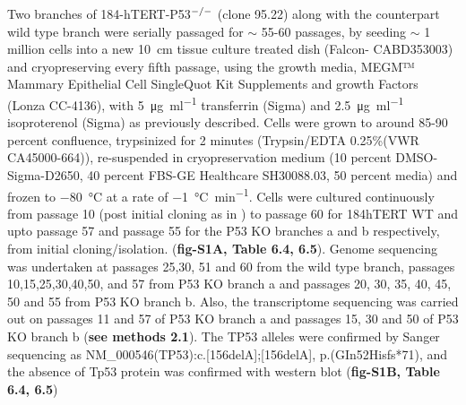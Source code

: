 \documentclass{article}
\begin{document}
Two branches of 184-hTERT-P53$^{\small{-/-}}$ (clone 95.22) along with the counterpart wild type branch were serially passaged for $\sim$ 55-60 passages, by seeding $\sim$ 1 million cells into a new \SI{10}{\cm} tissue culture treated dish (Falcon- CABD353003) and cryopreserving every fifth passage,
using the growth media, MEGM™ Mammary Epithelial Cell SingleQuot Kit Supplements and growth Factors (Lonza CC-4136), 
with \SI{5}{\ug\per\ml} transferrin (Sigma) and \SI{2.5}{\ug\per\ml} isoproterenol (Sigma) as previously described. Cells were grown to around 85-90 percent confluence, 
trypsinized for 2 minutes (Trypsin/EDTA 0.25\%(VWR CA45000-664)),
re-suspended in cryopreservation medium (10 percent DMSO-Sigma-D2650,
40 percent FBS-GE Healthcare SH30088.03, 50 percent media) and frozen
to \SI{-80}{\degreeCelsius} at a rate of
\SI{-1}{\degreeCelsius\per\minute}. 
Cells were cultured continuously from passage 10 (post initial cloning as in \cite{burleigh2015co}) to passage 60 for 184hTERT WT and upto passage 57 and passage 55 for the P53 KO branches a and b respectively, from initial cloning/isolation. 
(\textbf{fig-S1A, Table 6.4, 6.5}). 
Genome sequencing was undertaken at passages 25,30, 51 and 60 from the wild type branch, passages 10,15,25,30,40,50, and 57 from P53 KO branch a and passages 20, 30, 35, 40, 45, 50 and 55 from P53 KO branch b. Also, the transcriptome sequencing was carried out on passages 11 and 57 of P53 KO branch a and passages 15, 30 and 50 of P53 KO branch b (\textbf{see methods 2.1}).   
The TP53 alleles were confirmed by Sanger sequencing as  NM_000546(TP53):c.[156delA];[156delA], p.(GIn52Hisfs*71), and the absence of Tp53 protein was confirmed with western blot (\textbf{fig-S1B, Table 6.4, 6.5})
\end{document}
